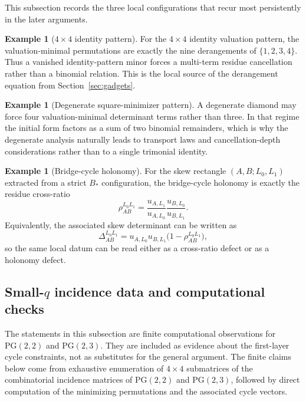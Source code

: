 \documentclass[11pt]{amsart}
\numberwithin{equation}{section}
\theoremstyle{plain}
\theoremstyle{definition}
\newtheorem{example}[theorem]{Example}
\theoremstyle{remark}
\begin{document}
This subsection records the three local configurations that recur most persistently in the later arguments.

\begin{example}[$4\times4$ identity pattern]
For the $4\times4$ identity valuation pattern, the valuation-minimal permutations are exactly the nine derangements of $\{1,2,3,4\}$. Thus a vanished identity-pattern minor forces a multi-term residue cancellation rather than a binomial relation. This is the local source of the derangement equation from Section~\ref{sec:gadgets}.
\end{example}

\begin{example}[Degenerate square-minimizer pattern]
A degenerate diamond may force four valuation-minimal determinant terms rather than three. In that regime the initial form factors as a sum of two binomial remainders, which is why the degenerate analysis naturally leads to transport laws and cancellation-depth considerations rather than to a single trimonial identity.
\end{example}

\begin{example}[Bridge-cycle holonomy]
For the skew rectangle $(A,B;L_0,L_1)$ extracted from a strict $B_*$ configuration, the bridge-cycle holonomy is exactly the residue cross-ratio
\[
\rho_{AB}^{L_0L_1}=\frac{u_{A,L_1}}{u_{A,L_0}}\frac{u_{B,L_0}}{u_{B,L_1}}.
\]
Equivalently, the associated skew determinant can be written as
\[
\Delta_{AB}^{L_0L_1}=u_{A,L_0}u_{B,L_1}\bigl(1-\rho_{AB}^{L_0L_1}\bigr),
\]
so the same local datum can be read either as a cross-ratio defect or as a holonomy defect.
\end{example}

\subsection{\texorpdfstring{Small-$q$ incidence data and computational checks}{Small-q incidence data and computational checks}}
The statements in this subsection are finite computational observations for $\mathrm{PG}(2,2)$ and $\mathrm{PG}(2,3)$. They are included as evidence about the first-layer cycle constraints, not as substitutes for the general argument.
The finite claims below come from exhaustive enumeration of $4\times4$ submatrices of the combinatorial incidence matrices of $\mathrm{PG}(2,2)$ and $\mathrm{PG}(2,3)$, followed by direct computation of the minimizing permutations and the associated cycle vectors.
\end{document}
